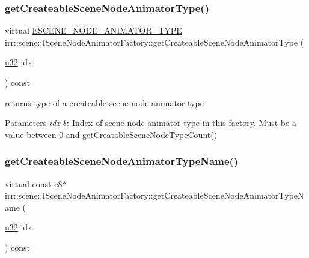 \subsubsection{\texorpdfstring{get\+Createable\+Scene\+Node\+Animator\+Type()}{getCreateableSceneNodeAnimatorType()}\hspace{0.1cm}{\footnotesize\ttfamily [2/2]}}
{\footnotesize\ttfamily virtual \hyperlink{namespaceirr_1_1scene_a327a1e43872705cf8f3f3342fb307d19}{E\+S\+C\+E\+N\+E\+\_\+\+N\+O\+D\+E\+\_\+\+A\+N\+I\+M\+A\+T\+O\+R\+\_\+\+T\+Y\+PE} irr\+::scene\+::\+I\+Scene\+Node\+Animator\+Factory\+::get\+Createable\+Scene\+Node\+Animator\+Type (\begin{DoxyParamCaption}\item[{\hyperlink{namespaceirr_a0416a53257075833e7002efd0a18e804}{u32}}]{idx }\end{DoxyParamCaption}) const\hspace{0.3cm}{\ttfamily [pure virtual]}}



returns type of a createable scene node animator type 


\begin{DoxyParams}{Parameters}
{\em idx} & Index of scene node animator type in this factory. Must be a value between 0 and get\+Creatable\+Scene\+Node\+Type\+Count() \\
\hline
\end{DoxyParams}
\mbox{\label{classirr_1_1scene_1_1ISceneNodeAnimatorFactory_af33905c1ad6cd478bfbcbda33c82e3bd}} 
\subsubsection{\texorpdfstring{get\+Createable\+Scene\+Node\+Animator\+Type\+Name()}{getCreateableSceneNodeAnimatorTypeName()}\hspace{0.1cm}{\footnotesize\ttfamily [1/4]}}
{\footnotesize\ttfamily virtual const \hyperlink{namespaceirr_a9395eaea339bcb546b319e9c96bf7410}{c8}$\ast$ irr\+::scene\+::\+I\+Scene\+Node\+Animator\+Factory\+::get\+Createable\+Scene\+Node\+Animator\+Type\+Name (\begin{DoxyParamCaption}\item[{\hyperlink{namespaceirr_a0416a53257075833e7002efd0a18e804}{u32}}]{idx }\end{DoxyParamCaption}) const\hspace{0.3cm}{\ttfamily [pure virtual]}}



